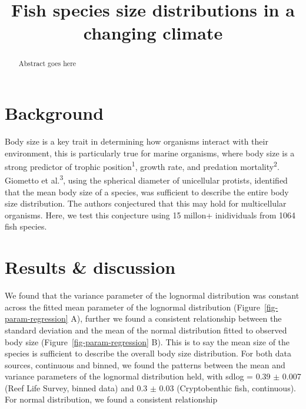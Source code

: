 \documentclass[
]{agujournal2019}
\begin{document}
\title{Fish species size distributions in a changing climate}



\begin{abstract}
Abstract goes here
\end{abstract}



\hypertarget{sec-background}{%
\section{Background}\label{sec-background}}

Body size is a key trait in determining how organisms interact with
their environment, this is particularly true for marine organisms, where
body size is a strong predictor of trophic position\textsuperscript{1},
growth rate, and predation mortality\textsuperscript{2}. Giometto et
al.\textsuperscript{3}, using the spherical diameter of unicellular
protists, identified that the mean body size of a species, was
sufficient to describe the entire body size distribution. The authors
conjectured that this may hold for multicellular organisms. Here, we
test this conjecture using 15 millon+ inidividuals from 1064 fish
species.

\hypertarget{sec-results-discussion}{%
\section{Results \& discussion}\label{sec-results-discussion}}

We found that the variance parameter of the lognormal distribution was
constant across the fitted mean parameter of the lognormal distribution
(Figure~\ref{fig-param-regression} A), further we found a consistent
relationship between the standard deviation and the mean of the normal
distribution fitted to observed body size
(Figure~\ref{fig-param-regression} B). This is to say the mean size of
the species is sufficient to describe the overall body size
distribution. For both data sources, continuous and binned, we found the
patterns between the mean and variance parameters of the lognormal
distribution held, with sdlog = 0.39 \(\pm\) 0.007 (Reef Life Survey,
binned data) and 0.3 \(\pm\) 0.03 (Cryptobenthic fish, continuous). For
normal distribution, we found a consistent relationship
\end{document}
